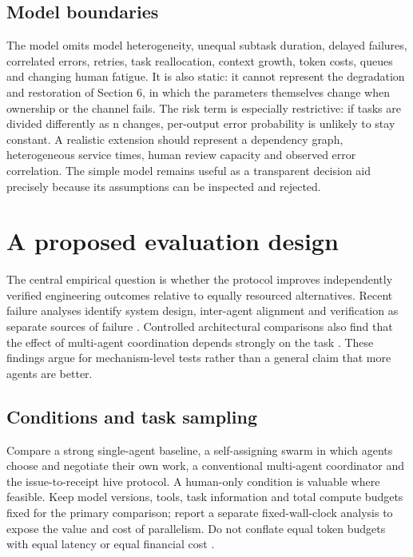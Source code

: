 \documentclass[11pt]{article}
\begin{document}
\subsection{Model boundaries}

The model omits model heterogeneity, unequal subtask duration, delayed failures, correlated errors, retries, task reallocation, context growth, token costs, queues and changing human fatigue. It is also static: it cannot represent the degradation and restoration of Section 6, in which the parameters themselves change when ownership or the channel fails. The risk term is especially restrictive: if tasks are divided differently as n changes, per-output error probability is unlikely to stay constant. A realistic extension should represent a dependency graph, heterogeneous service times, human review capacity and observed error correlation. The simple model remains useful as a transparent decision aid precisely because its assumptions can be inspected and rejected.

\section{A proposed evaluation design}

The central empirical question is whether the protocol improves independently verified engineering outcomes relative to equally resourced alternatives. Recent failure analyses identify system design, inter-agent alignment and verification as separate sources of failure \cite{cemri}. Controlled architectural comparisons also find that the effect of multi-agent coordination depends strongly on the task \cite{kim}. These findings argue for mechanism-level tests rather than a general claim that more agents are better.

\subsection{Conditions and task sampling}

Compare a strong single-agent baseline, a self-assigning swarm in which agents choose and negotiate their own work, a conventional multi-agent coordinator and the issue-to-receipt hive protocol. A human-only condition is valuable where feasible. Keep model versions, tools, task information and total compute budgets fixed for the primary comparison; report a separate fixed-wall-clock analysis to expose the value and cost of parallelism. Do not conflate equal token budgets with equal latency or equal financial cost \cite{kapoor}.
\end{document}
